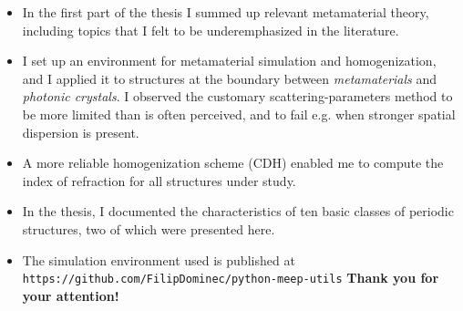 \documentclass[t]{beamer} \usepackage[english]{babel} \usepackage[utf8]{inputenc} \usetheme{Frankfurt} %
\begin{document}
\begin{frame}[plain]{\tiny{\vspace{-1em}{Conclusions}\vspace{-.5em}}}%
\begin{itemize}
		\vspace{-.3em}
	\item In the first part of the thesis I summed up relevant metamaterial theory, including topics that I felt to be underemphasized in the literature. 


	\item I set up an environment for metamaterial simulation and homogenization, and I applied it to structures at the boundary between \textit{metamaterials} and \textit{photonic crystals}. I observed the customary scattering-parameters method to be more limited than is often perceived, and to fail e.g. when stronger spatial dispersion is present.

	\item A more reliable homogenization scheme (CDH) enabled me to compute the index of refraction for all structures under study.

	\item In the thesis, I documented the characteristics of ten basic classes of periodic structures, two of which were presented here.

	\item The simulation environment used is published at \\
	\texttt{https://github.com/FilipDominec/python-meep-utils} 
	\vfill
	{\hfill \color{myblue} \textbf{Thank you for your attention!} \hfill\,}
\end{itemize}

\end{frame} %
\end{document}
